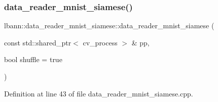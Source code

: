 \subsubsection{\texorpdfstring{data\+\_\+reader\+\_\+mnist\+\_\+siamese()}{data\_reader\_mnist\_siamese()}\hspace{0.1cm}{\footnotesize\ttfamily [1/2]}}
{\footnotesize\ttfamily lbann\+::data\+\_\+reader\+\_\+mnist\+\_\+siamese\+::data\+\_\+reader\+\_\+mnist\+\_\+siamese (\begin{DoxyParamCaption}\item[{const std\+::shared\+\_\+ptr$<$ cv\+\_\+process $>$ \&}]{pp,  }\item[{bool}]{shuffle = {\ttfamily true} }\end{DoxyParamCaption})}



Definition at line 43 of file data\+\_\+reader\+\_\+mnist\+\_\+siamese.\+cpp.


